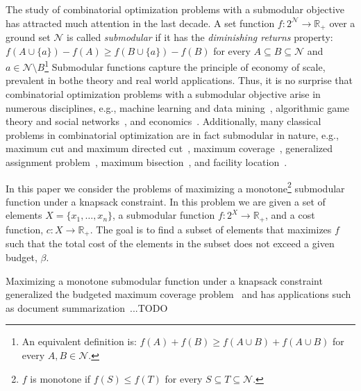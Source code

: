 The study of combinatorial optimization problems with a submodular objective has attracted much attention in the last decade. 
A set function $f:2^\mathcal{N} \to \mathbb{R}_+$ over a ground set $\mathcal{N}$ is called \emph{submodular} if it has the \emph{diminishing returns} property:
$f(A \cup \{a\}) - f(A) \geq f(B \cup \{a\}) - f(B)$ for every $A \subseteq B \subseteq \mathcal{N}$ and $a \in \mathcal{N} \setminus B$\footnote{
    An equivalent definition is: $f(A) + f(B) \geq f(A \cup B) + f(A \cup B)$ for every $A,B \in \mathcal{N}$.
}
Submodular functions capture the principle of economy of scale, prevalent in bothe theory and real world applications.
Thus, it is no surprise that combinatorial optimization problems with a submodular objective arise in numerous disciplines, e.g., machine learning and data mining~\cite{bach2013learning,bordeaux2014tractability}, algorithmic game theory and social networks~\cite{dughmi2009revenue,hartline2008optimal,he2015stability,kempe2003maximizing,schulz2013approximating}, and economics~\cite{ahmed2011maximizing}.
Additionally, many classical problems in combinatorial optimization are in fact submodular in nature, e.g., maximum cut and maximum directed cut~\cite{goemans1995improved,Halperin:2001:CAA:365411.365412,Hastad:2001:OIR:502090.502098,Karp1972,Khot05optimalinapproximability}, maximum coverage~\cite{Feige:1998:TLN:285055.285059,KHULLER199939}, generalized assignment problem~\cite{Chekuri06apolynomial,Cohen06anefficient,Feige2006ApproximationAF,Fleischer:2006:TAA:1109557.1109624}, maximum bisection~\cite{DBLP:journals/talg/AustrinBG16,DBLP:journals/algorithmica/FriezeJ97}, and facility location~\cite{DBLP:journals/dam/AgeevS99,CORNUEJOLS1977163,doi:10.1287/mnsc.23.8.789}.

In this paper we consider the problems of maximizing a monotone\footnote{
    $f$ is monotone if $f(S) \leq f(T)$ for every $S \subseteq T \subseteq \mathcal{N}$.
} submodular function under a knapsack constraint.
In this problem we are given a set of elements
$X = \{x_1, \dots, x_n\}$, a submodular function $f:2^X \to \mathbb{R}_+$, and a cost function, $c:X \to \mathbb{R}_+$.
The goal is to find a subset of elements that maximizes $f$ such that the total cost of the elements in the subset does not exceed a given budget, 
$\beta$.

Maximizing a monotone submodular function under a knapsack constraint generalized the budgeted maximum coverage problem~\cite{khuller1999budgeted} and has applications such as document summarization~\cite{lin2010multi}...TODO


